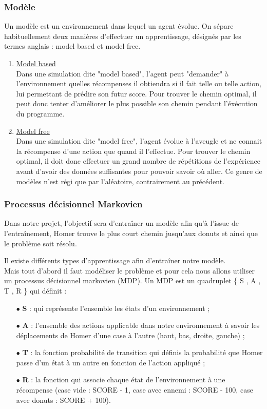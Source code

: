 \subsubsection{Modèle}
Un modèle est un environnement dans lequel un agent évolue. On sépare habituellement deux manières d'effectuer un apprentissage, désignés par les termes anglais : model based et model free.
\begin{enumerate}
\item{\underline{Model based}}\\
Dans une simulation dite "model based", l'agent peut "demander" à l'environnement quelles récompenses il obtiendra si il fait telle ou telle action, lui permettant de prédire son futur score. Pour trouver le chemin optimal, il peut donc tenter d'améliorer le plus possible son chemin pendant l'éxécution du programme.
\item{\underline{Model free}}\\
Dans une simulation dite "model free", l'agent évolue à l'aveugle et ne connait la récompense d'une action que quand il l'effectue. Pour trouver le chemin optimal, il doit donc effectuer un grand nombre de répétitions de l'expérience avant d'avoir des données suffisantes pour pouvoir savoir où aller. Ce genre de modèles n'est régi que par l'aléatoire, contrairement au précédent.
\end{enumerate}

\subsubsection{Processus décisionnel Markovien}

Dans notre projet, l'objectif sera d'entraîner un modèle afin qu'à l'issue de l'entraînement, Homer trouve le plus court chemin jusqu'aux donuts et ainsi que le problème soit résolu.

Il existe différents types d'apprentissage afin d'entraîner notre modèle. \\
Mais tout d'abord il faut modéliser le problème et pour cela nous allons utiliser un processus décisionnel markovien (MDP). Un MDP est un quadruplet \{ S , A , T , R \} qui définit : 
\begin{itemize}
  \item[$\bullet$] \textbf{S} : qui représente l'ensemble les états d'un environnement ;
  \item[$\bullet$] \textbf{A} : l'ensemble des actions applicable dans notre environnement à savoir les déplacements de Homer d'une case à l'autre (haut, bas, droite, gauche) ; 
  \item[$\bullet$] \textbf{T} : la fonction probabilité de transition qui définis la probabilité que Homer passe d'un état à un autre en fonction de l'action appliqué ;
  \item[$\bullet$] \textbf{R} : la fonction qui associe chaque état de l'environnement à une récompense (case vide : SCORE - 1, case avec ennemi :  SCORE - 100, case avec donuts  : SCORE + 100).
\end{itemize}
